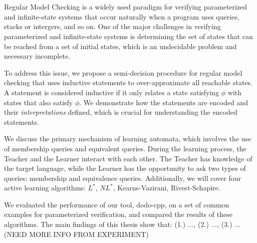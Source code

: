 \chapter{\abstractname}

Regular Model Checking is a 
widely used paradigm for verifying parameterized and infinite-state systems that 
occur naturally when a program uses queries, stacks or intergers, and so on.
One of the major challenges in verifying parameterized and infinite-state systems is 
determining the set of states that can be reached from a set of initial states,
which is an undecidable problem and necessary incomplete.

To address this issue, we propose a semi-decision procedure for regular model checking that uses inductive statements to over-approximate all reachable states.
A statement is considered inductive if it only relates a state satisfying $\phi$ with states that also satisfy $\phi$.
We demonstrate how the statements are encoded and their \textit{interpretations} defined, 
which is crucial for understanding the encoded statements.

We discuss the primary mechanism of learning automata, which involves the use of 
membership queries and equivalent queries. 
During the learning process, the Teacher and the Learner interact with each other. 
The Teacher has knowledge of the target language, 
while the Learner has the opportunity to ask two types of queries: membership and equivalence queries.
Additionally, we will cover four active learning algorithms: $L^*$, $NL^*$, Kearns-Vazirani, Rivest-Schapire.

We evaluated the performance of our tool, dodo-cpp, on a set of common examples for parameterized verification, 
and compared the results of these algorithms.
The main findings of this thesis show that: (1.) $\dots$, (2.) $\dots$, (3.) $\dots$ (NEED MORE INFO FROM EXPERIMENT)


